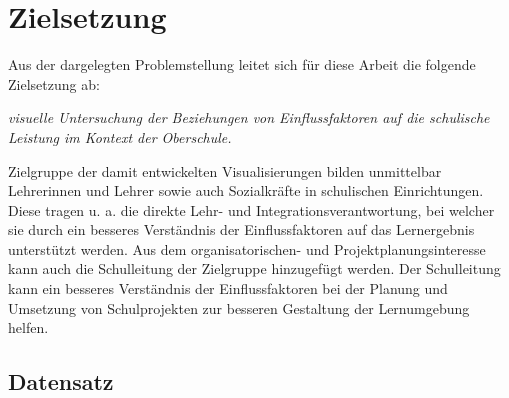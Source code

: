 \chapter[Zielsetzung]{Zielsetzung}

Aus der dargelegten Problemstellung leitet sich für diese Arbeit die folgende Zielsetzung ab:

\begin{center}
    \textit{visuelle Untersuchung der Beziehungen von Einflussfaktoren auf die schulische Leistung im Kontext der Oberschule.}
\end{center}    

Zielgruppe der damit entwickelten Visualisierungen bilden unmittelbar Lehrerinnen und Lehrer sowie auch Sozialkräfte in schulischen Einrichtungen. 
Diese tragen u. a. die direkte Lehr- und Integrationsverantwortung, bei welcher sie durch ein besseres Verständnis der Einflussfaktoren auf das Lernergebnis unterstützt werden.
Aus dem organisatorischen- und Projektplanungsinteresse kann auch die Schulleitung der Zielgruppe hinzugefügt werden.
Der Schulleitung kann ein besseres Verständnis der Einflussfaktoren bei der Planung und Umsetzung von Schulprojekten zur besseren Gestaltung der Lernumgebung helfen.



\section[Untersuchter Datensatz]{Datensatz}

